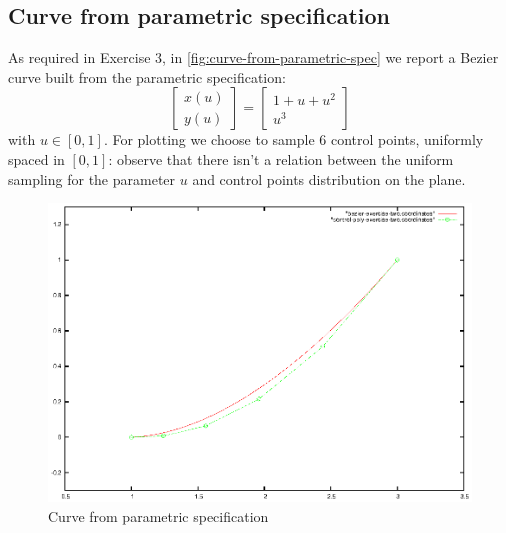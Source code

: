 \documentclass{article}
\begin{document}
\subsection{Curve from parametric specification}
As required in Exercise 3, in \autoref{fig:curve-from-parametric-spec}
we report a Bezier curve built from the parametric specification:
\begin{displaymath}
  \left [  \begin{array}{c}
      x(u) \\
      y(u)
    \end{array} \right ] = \left [  
    \begin{array}{c}
      1 + u + u^2 \\
      u^3
    \end{array} \right ]
\end{displaymath}
with $u\in[0,1]$. For plotting we choose to sample 6 control points,
uniformly spaced in $[0,1]$: observe that there isn't a relation
between the uniform sampling for the parameter $u$ and control points
distribution on the plane.
\begin{figure}
  \centering
  \includegraphics{bezier-deCasteljau-curves/exercise-two}
  \caption{Curve from parametric specification}
  \label{fig:curve-from-parametric-spec}
\end{figure}
\end{document}
